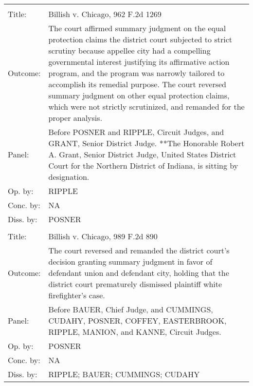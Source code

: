 \documentclass[10pt, letterpaper]{article}
\begin{document}
\begin{spacing}{1.0}
\begin{footnotesize}
\begin{longtable}[H]{lp{6in}}
        \arrayrulecolor{black}\hline\\[-4pt]
        Title: & Billish v. Chicago, 962 F.2d 1269\\[2pt]
        Outcome: & The court affirmed summary judgment on the equal protection claims the district court subjected to strict scrutiny because appellee city had a compelling governmental interest justifying its affirmative action program, and the program was narrowly tailored to accomplish its remedial purpose. The court reversed summary judgment on other equal protection claims, which were not strictly scrutinized, and remanded for the proper analysis.\\[2pt]
        Panel: & Before POSNER and RIPPLE, Circuit Judges, and GRANT, Senior District Judge. **The Honorable Robert A. Grant, Senior District Judge, United States District Court for the Northern District of Indiana, is sitting by designation.\\[2pt]
        Op. by: & RIPPLE \\[2pt]
        Conc. by: & NA\\[2pt]
        Diss. by: & POSNER \\[2pt]
        \arrayrulecolor{gray}\hline\\[-4pt]
        Title: & Billish v. Chicago, 989 F.2d 890\\[2pt]
        Outcome: & The court reversed and remanded the district court's decision granting summary judgment in favor of defendant union and defendant city, holding that the district court prematurely dismissed plaintiff white firefighter's case.\\[2pt]
        Panel: & Before BAUER, Chief Judge, and CUMMINGS, CUDAHY, POSNER, COFFEY, EASTERBROOK, RIPPLE, MANION, and KANNE, Circuit Judges.  \\[2pt]
        Op. by: & POSNER \\[2pt]
        Conc. by: & NA\\[2pt]
        Diss. by: & RIPPLE; BAUER; CUMMINGS; CUDAHY \\[2pt]
        

\end{longtable}
\end{footnotesize}
\end{spacing}
\end{document}
